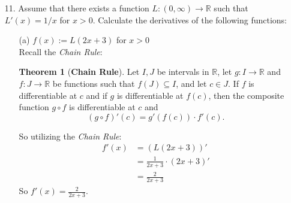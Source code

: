 \documentclass[12pt,letterpaper]{article}
\newcommand{\R}{\mathbb{R}}
\theoremstyle{case}
\theoremstyle{definition}
\newtheorem*{theorem*}{Theorem}
\begin{document}
\begin{enumerate}
\begin{enumerate}
\begin{proof}
				$\therefore$ If $f$ is an even function, then $f'$ is an odd function.
			\end{proof}
		
			\begin{proof}
				Let $g: \R \to \R$ be defined such that $g(-x)=-g(x)\ \forall\ x \in \R$. Then
				\[g'(c) = \lim\limits_{x \to c} \frac{g(x)-g(c)}{x-c}\]
				And
				\[g'(-c) = \lim\limits_{x \to -c} \frac{g(x)-g(-c)}{x-(-c)}\]
				Let us change every $x$ for $-x$ if $-x \to -c$ then $x \to c$. So
				\begin{align*}
					&=\lim\limits_{x \to c} \frac{g(-x) - (-g(c))}{-x+c} \\
					&=\lim\limits_{x \to c} \frac{-g(x)+g(c)}{-x+c} &\because g(-x)=-g(x)\ \forall\ x \in \R \\
					&=\lim\limits_{x \to c} \frac{-(g(x)-g(c))}{-(x-c)} \\
					&= \lim\limits_{x \to c} \frac{g(x)-g(c)}{x-c} \\
					&= g'(c)
				\end{align*}
				Thus we have that $g'(-c)=g'(c)$, an even function.\\
				
				$\therefore$ If $g$ is an odd function, then $g'$ is an even function.
			\end{proof}
			\item[11.] Assume that there exists a function $L:(0,\infty) \to \R$ such that $L'(x)=1/x$ for $x>0$. Calculate the derivatives of the following functions:
			\begin{enumerate}
				\item[(a)] $f(x):=L(2x+3)$ for $x>0$\\
				
				Recall the \textit{Chain Rule}:
				\begin{theorem*}[\textbf{Chain Rule}]
					Let $I, J$ be intervals in $\R$, let $g:I \rightarrow \R$ and $f:J \rightarrow \R$ be functions such that $f(J) \subseteq I$, and let $c \in J$. If $f$ is differentiable at $c$ and if $g$ is differentiable at $f(c)$, then the composite function $g \circ f$ is differentiable at $c$ and
					\[(g \circ f)'(c) = g'(f(c)) \cdot f'(c).\]
				\end{theorem*}
				So utilizing the \textit{Chain Rule}:
				\begin{align*}
					f'(x) &= (L(2x+3))' \\
					&= \frac{1}{2x+3} \cdot (2x+3)' \\
					&= \frac{2}{2x+3}
				\end{align*}
				So $f'(x) = \frac{2}{2x+3}$.\\
				

\end{enumerate}
\end{enumerate}
\end{enumerate}
\end{document}
